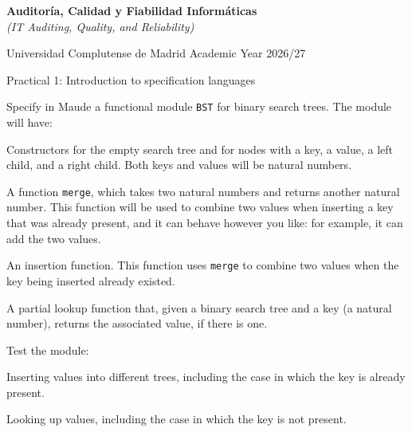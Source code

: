 

\usepackage{pgf}
\usepackage{tikz}
\usepackage{pstricks,pst-node,pst-tree,pstricks-add}



\begin{center}
{\Large\textbf{Auditor\'ia, Calidad y Fiabilidad Inform\'aticas}}\\[2pt]
\textit{(IT Auditing, Quality, and Reliability)}
\smallskip

\large
Universidad Complutense de Madrid \qquad Academic Year 2026/27
\medskip

Practical 1: Introduction to specification languages\hfill\mbox{}

\noindent\hrulefill
\end{center}

\begin{listaejercicios}

\item
Specify in Maude a functional module \verb"BST" for binary search trees. The
module will have:

\begin{listaalph}
\item
Constructors for the empty search tree and for nodes with a key, a value, a
left child, and a right child. Both keys and values will be natural numbers.

\item
A function \verb"merge", which takes two natural numbers and returns another
natural number. This function will be used to combine two values when
inserting a key that was already present, and it can behave however you
like: for example, it can add the two values.

\item
An insertion function. This function uses \verb"merge" to combine two values
when the key being inserted already existed.

\item
A partial lookup function that, given a binary search tree and a key (a
natural number), returns the associated value, if there is one.

\end{listaalph}

\item
Test the module:

\begin{listaalph}

\item
Inserting values into different trees, including the case in which the key
is already present.

\item
Looking up values, including the case in which the key is not present.

\end{listaalph}

\end{listaejercicios}



